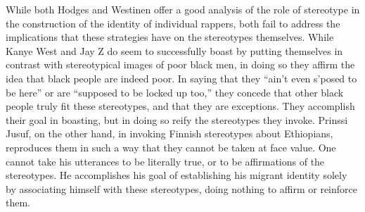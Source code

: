 \documentclass[man,12pt,natbib]{apa6}
\begin{document}
While both Hodges and Westinen offer a good analysis of the role of stereotype
in the construction of the identity of individual rappers, both fail to address
the implications that these strategies have on the stereotypes themselves.
While Kanye West and Jay Z do seem to successfully boast by putting themselves
in contrast with stereotypical images of poor black men, in doing so they
affirm the idea that black people are indeed poor.  In saying that they ``ain't
even s'posed to be here'' or are ``supposed to be locked up too,'' they concede
that other black people truly fit these stereotypes, and that they are
exceptions.  They accomplish their goal in boasting, but in doing so reify the
stereotypes they invoke.  Prinssi Jusuf, on the other hand, in invoking Finnish
stereotypes about Ethiopians, reproduces them in such a way that they cannot be
taken at face value.  One cannot take his utterances to be literally true, or
to be affirmations of the stereotypes.  He accomplishes his goal of
establishing his migrant identity solely by associating himself with these
stereotypes, doing nothing to affirm or reinforce them. 

\clearpage

\end{document}
